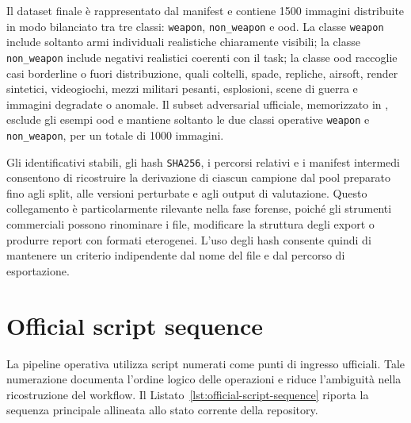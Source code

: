 Il dataset finale è rappresentato dal manifest  e contiene 1500 immagini distribuite in modo bilanciato tra tre classi: \texttt{weapon}, \texttt{non\_weapon} e \gls{ood}. La classe \texttt{weapon} include soltanto armi individuali realistiche chiaramente visibili; la classe \texttt{non\_weapon} include negativi realistici coerenti con il task; la classe \gls{ood} raccoglie casi borderline o fuori distribuzione, quali coltelli, spade, repliche, airsoft, render sintetici, videogiochi, mezzi militari pesanti, esplosioni, scene di guerra e immagini degradate o anomale. Il subset adversarial ufficiale, memorizzato in , esclude gli esempi \gls{ood} e mantiene soltanto le due classi operative \texttt{weapon} e \texttt{non\_weapon}, per un totale di 1000 immagini.

Gli identificativi stabili, gli hash \texttt{SHA256}, i percorsi relativi e i manifest intermedi consentono di ricostruire la derivazione di ciascun campione dal pool preparato fino agli split, alle versioni perturbate e agli output di valutazione. Questo collegamento è particolarmente rilevante nella fase forense, poiché gli strumenti commerciali possono rinominare i file, modificare la struttura degli export o produrre report con formati eterogenei. L'uso degli hash consente quindi di mantenere un criterio indipendente dal nome del file e dal percorso di esportazione.

\section{Official script sequence}
\label{app:official-script-sequence}

La pipeline operativa utilizza script numerati come punti di ingresso ufficiali. Tale numerazione documenta l'ordine logico delle operazioni e riduce l'ambiguità nella ricostruzione del workflow. Il Listato~\ref{lst:official-script-sequence} riporta la sequenza principale allineata allo stato corrente della repository.

